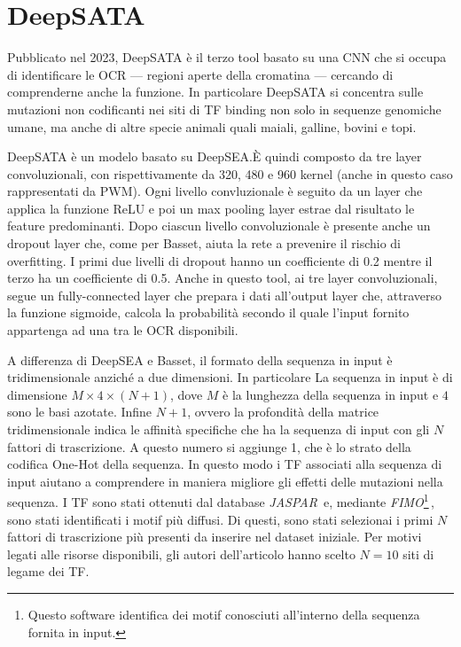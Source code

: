 \section{DeepSATA}\label{sec:DeepSATA}
% 
Pubblicato nel 2023, DeepSATA è il terzo tool basato su una \acs{CNN} che si occupa di identificare le \acs{OCR} — regioni aperte della cromatina — cercando di comprenderne anche la funzione. In particolare DeepSATA si concentra sulle mutazioni non codificanti nei siti di \acs{TF} binding non solo in sequenze genomiche umane, ma anche di altre specie animali quali maiali, galline, bovini e topi.

DeepSATA è un modelo basato su DeepSEA.\@ È quindi composto da tre layer convoluzionali, con rispettivamente da 320, 480 e 960 kernel (anche in questo caso rappresentati da \acs{PWM}). Ogni livello convluzionale è seguito da un layer che applica la funzione \acs{ReLU} e poi un max pooling layer estrae dal risultato le feature predominanti. Dopo ciascun livello convoluzionale è presente anche un dropout layer che, come per Basset, aiuta la rete a prevenire il rischio di overfitting. I primi due livelli di dropout hanno un coefficiente di 0.2 mentre il terzo ha un coefficiente di 0.5. Anche in questo tool, ai tre layer convoluzionali, segue un fully-connected layer che prepara i dati all'output layer che, attraverso la funzione sigmoide, calcola la probabilità secondo il quale l'input fornito appartenga ad una tra le \acs{OCR} disponibili.

A differenza di DeepSEA e Basset, il formato della sequenza in input è tridimensionale anziché a due dimensioni. In particolare La sequenza in input è di dimensione $M \times 4 \times (N + 1)$, dove $M$ è la lunghezza della sequenza in input e $4$ sono le basi azotate. Infine $N + 1$, ovvero la profondità della matrice tridimensionale indica le affinità specifiche che ha la sequenza di input con gli $N$ fattori di trascrizione. A questo numero si aggiunge 1, che è lo strato della codifica One-Hot della sequenza. In questo modo i \acs{TF} associati alla sequenza di input aiutano a comprendere in maniera migliore gli effetti delle mutazioni nella sequenza. I \acs{TF} sono stati ottenuti dal database \textsl{JASPAR}\,\cite{jaspar} e, mediante \textsl{FIMO}\footnote{Questo software identifica dei motif conosciuti all'interno della sequenza fornita in input.}\,\cite{grant2011fimo}, sono stati identificati i motif più diffusi. Di questi, sono stati selezionai i primi $N$ fattori di trascrizione più presenti da inserire nel dataset iniziale. Per motivi legati alle risorse disponibili, gli autori dell'articolo hanno scelto $N=10$ siti di legame dei \acs{TF}. 

